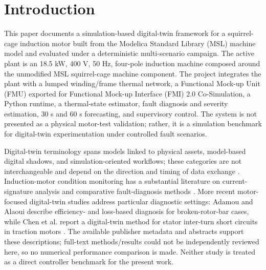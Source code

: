 \documentclass[machines,article,submit,moreauthors]{Definitions/mdpi}
\begin{document}
\maketitle

\section{Introduction}

This paper documents a simulation-based digital-twin framework for a squirrel-cage induction motor built from the Modelica Standard Library (MSL) machine model and evaluated under a deterministic multi-scenario campaign. The active plant is an 18.5 kW, 400 V, 50 Hz, four-pole induction machine composed around the unmodified MSL squirrel-cage machine component. The project integrates the plant with a lumped winding/frame thermal network, a Functional Mock-up Unit (FMU) exported for Functional Mock-up Interface (FMI) 2.0 Co-Simulation, a Python runtime, a thermal-state estimator, fault diagnosis and severity estimation, 30 s and 60 s forecasting, and supervisory control. The system is not presented as a physical motor-test validation; rather, it is a simulation benchmark for digital-twin experimentation under controlled fault scenarios.

Digital-twin terminology spans models linked to physical assets, model-based digital shadows, and simulation-oriented workflows; these categories are not interchangeable and depend on the direction and timing of data exchange \cite{kritzinger2018}. Induction-motor condition monitoring has a substantial literature on current-signature analysis and comparative fault-diagnosis methods \cite{benbouzid2000,liu2017}. More recent motor-focused digital-twin studies address particular diagnostic settings: Adamou and Alaoui describe efficiency- and loss-based diagnosis for broken-rotor-bar cases, while Chen et al. report a digital-twin method for stator inter-turn short circuits in traction motors \cite{adamou2024,chen2025}. The available publisher metadata and abstracts support these descriptions; full-text methods/results could not be independently reviewed here, so no numerical performance comparison is made. Neither study is treated as a direct controller benchmark for the present work.
\end{document}
